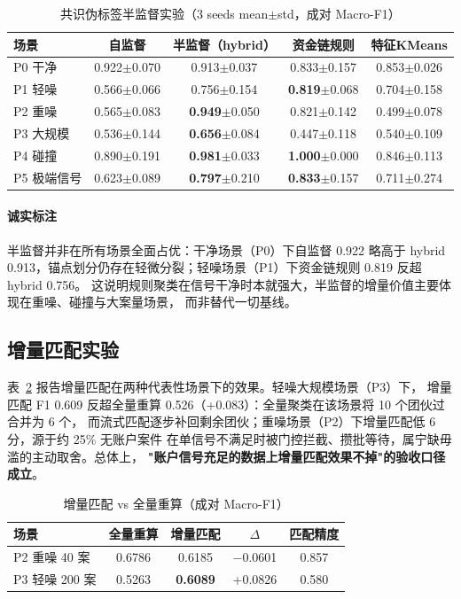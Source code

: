 \documentclass[12pt,a4paper,fontset=windows]{ctexart}
\begin{document}
\begin{table}[htbp]
  \centering
  \caption{共识伪标签半监督实验（3 seeds mean$\pm$std，成对 Macro-F1）}
  \label{tab:semi}
  \begin{tabular}{lcccc}
    \toprule
    场景 & 自监督 & 半监督（hybrid） & 资金链规则 & 特征KMeans \\
    \midrule
    P0 干净 & 0.922$\pm$0.070 & 0.913$\pm$0.037 & 0.833$\pm$0.157 & 0.853$\pm$0.026 \\
    P1 轻噪 & 0.566$\pm$0.066 & 0.756$\pm$0.154 & \textbf{0.819}$\pm$0.068 & 0.704$\pm$0.158 \\
    P2 重噪 & 0.565$\pm$0.083 & \textbf{0.949}$\pm$0.050 & 0.821$\pm$0.142 & 0.499$\pm$0.078 \\
    P3 大规模 & 0.536$\pm$0.144 & \textbf{0.656}$\pm$0.084 & 0.447$\pm$0.118 & 0.540$\pm$0.109 \\
    P4 碰撞 & 0.890$\pm$0.191 & \textbf{0.981}$\pm$0.033 & \textbf{1.000}$\pm$0.000 & 0.846$\pm$0.113 \\
    P5 极端信号 & 0.623$\pm$0.089 & \textbf{0.797}$\pm$0.210 & \textbf{0.833}$\pm$0.157 & 0.711$\pm$0.274 \\
    \bottomrule
  \end{tabular}
\end{table}

\paragraph{诚实标注} 半监督并非在所有场景全面占优：干净场景（P0）下自监督 0.922 略高于
hybrid 0.913，锚点划分仍存在轻微分裂；轻噪场景（P1）下资金链规则 0.819 反超 hybrid 0.756。
这说明规则聚类在信号干净时本就强大，半监督的增量价值主要体现在重噪、碰撞与大案量场景，
而非替代一切基线。

\subsection{增量匹配实验}

表~\ref{tab:incr} 报告增量匹配在两种代表性场景下的效果。轻噪大规模场景（P3）下，
增量匹配 F1 0.609 反超全量重算 0.526（+0.083）：全量聚类在该场景将 10 个团伙过合并为 6 个，
而流式匹配逐步补回剩余团伙；重噪场景（P2）下增量匹配低 6 分，源于约 25\% 无账户案件
在单信号不满足时被门控拦截、攒批等待，属宁缺毋滥的主动取舍。总体上，
\textbf{"账户信号充足的数据上增量匹配效果不掉"的验收口径成立}。

\begin{table}[htbp]
  \centering
  \caption{增量匹配 vs 全量重算（成对 Macro-F1）}
  \label{tab:incr}
  \begin{tabular}{lcccc}
    \toprule
    场景 & 全量重算 & 增量匹配 & $\Delta$ & 匹配精度 \\
    \midrule
    P2 重噪 40 案 & 0.6786 & 0.6185 & $-$0.0601 & 0.857 \\
    P3 轻噪 200 案 & 0.5263 & \textbf{0.6089} & +0.0826 & 0.580 \\
    \bottomrule
  \end{tabular}
\end{table}
\end{document}
